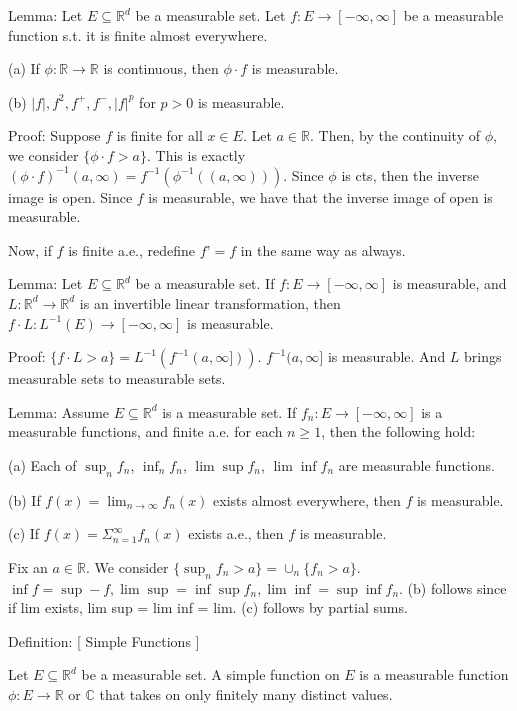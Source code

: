\documentclass[10pt]{article}
\begin{document}
Lemma: Let $E \subseteq \mathbb{R}^d$ be a measurable set. Let $f: E \to [-\infty,\infty]$ be a measurable function s.t. it is finite almost everywhere. 

(a) If $\phi: \mathbb{R} \to \mathbb{R}$ is continuous, then $ \phi \cdot f$ is measurable. 

(b) $|f|, f^2, f^+, f^-, |f|^p$ for $p > 0$ is measurable. 

Proof: Suppose $f$ is finite for all $x \in E$. Let $a \in \mathbb{R}$. Then, by the continuity of $\phi$, we consider $\{\phi \cdot f > a \}$. This is exactly $(\phi \cdot f)^{-1} (a,\infty) = f^{-1}(\phi^{-1}((a,\infty)))$. Since $\phi$ is cts, then the inverse image is open. Since $f$ is measurable, we have that the inverse image of open is measurable.

Now, if $f$ is finite a.e., redefine $f’ = f$ in the same way as always.

Lemma: Let $E \subseteq \mathbb{R}^d$ be a measurable set. If $f: E \to [-\infty,\infty]$ is measurable, and $L: \mathbb{R}^d \to \mathbb{R}^d$ is an invertible linear transformation, then $f \cdot L: L^{-1}(E) \to [-\infty,\infty]$ is measurable.

Proof: $\{ f \cdot L > a \} = L^{-1}(f^{-1}(a,\infty]))$. $f^{-1}(a,\infty]$ is measurable. And $L$ brings measurable sets to measurable sets.

Lemma: Assume $E \subseteq \mathbb{R}^d$ is a measurable set. If $f_n: E \to [-\infty,\infty]$ is a measurable functions, and finite a.e. for each $n \geq 1$, then the following hold:

(a) Each of $\sup_n f_n$, $\inf_n f_n$, $\lim\sup f_n$, $\lim \inf f_n$ are measurable functions.

(b) If $f(x) = \lim_{n \to \infty} f_n(x)$ exists almost everywhere, then $f$ is measurable.

(c) If $f(x) = \Sigma_{n=1}^\infty f_n(x)$ exists a.e., then $f$ is measurable.

Fix an $a \in \mathbb{R}$. We consider $\{ \sup_{n} f_n > a \} = \cup_n \{ f_n > a \}$. $\inf f = \sup -f, \lim \sup = \inf \sup f_n, \lim \inf  = \sup \inf f_n$. (b) follows since if lim exists, lim sup = lim inf = lim. (c) follows by partial sums.

Definition: [ Simple Functions ] 

Let $E \subseteq \mathbb{R}^d$ be a measurable set. A simple function on $E$ is a measurable function $\phi: E \to \mathbb{R} \text { or } \mathbb{C}$ that takes on only finitely many distinct values.
\end{document}
